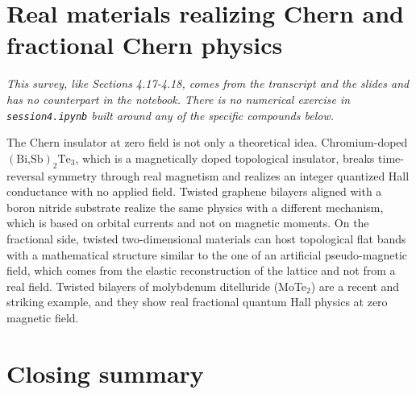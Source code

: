 \section{Real materials realizing Chern and fractional Chern physics}

\emph{This survey, like Sections 4.17-4.18, comes from the transcript and the slides and has no
counterpart in the notebook. There is no numerical exercise in \texttt{session4.ipynb} built around
any of the specific compounds below.}

The Chern insulator at zero field is not only a theoretical idea. Chromium-doped
$(\text{Bi,Sb})_2\text{Te}_3$, which is a magnetically doped topological insulator, breaks
time-reversal symmetry through real magnetism and realizes an integer quantized Hall conductance
with no applied field. Twisted graphene bilayers aligned with a boron nitride substrate realize the
same physics with a different mechanism, which is based on orbital currents and not on magnetic
moments. On the fractional side, twisted two-dimensional materials can host topological flat bands
with a mathematical structure similar to the one of an artificial pseudo-magnetic field, which
comes from the elastic reconstruction of the lattice and not from a real field. Twisted bilayers of
molybdenum ditelluride (MoTe$_2$) are a recent and striking example, and they show real fractional
quantum Hall physics at zero magnetic field.

\section{Closing summary}

